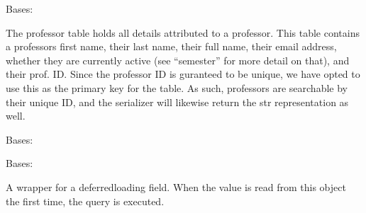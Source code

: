 \documentclass[letterpaper,10pt,english]{sphinxmanual}
\begin{document}
\begin{fulllineitems}
\label{\detokenize{models/professor:api.models.professor.Professor}}
\pysigstartsignatures
{}
\pysigstopsignatures
\sphinxAtStartPar
Bases: 

\sphinxAtStartPar
The professor table holds all details attributed to a professor.
This table contains a professors first name, their last name,
their full name, their email address, whether they are currently
active (see “semester” for more detail on that), and their prof.
ID. Since the professor ID is guranteed to be unique, we have opted
to use this as the primary key for the table. As such, professors
are searchable by their unique ID, and the serializer will likewise
return the str representation as well.

\begin{fulllineitems}
\label{\detokenize{models/professor:api.models.professor.Professor.DoesNotExist}}
\pysigstartsignatures
{}
\pysigstopsignatures
\sphinxAtStartPar
Bases: 

\end{fulllineitems}


\begin{fulllineitems}
\label{\detokenize{models/professor:api.models.professor.Professor.MultipleObjectsReturned}}
\pysigstartsignatures
{}
\pysigstopsignatures
\sphinxAtStartPar
Bases: 

\end{fulllineitems}


\begin{fulllineitems}
\label{\detokenize{models/professor:api.models.professor.Professor.email}}
\pysigstartsignatures
{}
\pysigstopsignatures
\sphinxAtStartPar
A wrapper for a deferred\sphinxhyphen{}loading field. When the value is read from this
object the first time, the query is executed.


\end{fulllineitems}
\end{fulllineitems}
\end{document}
